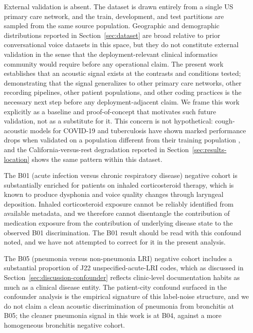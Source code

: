 \documentclass[utf8]{FrontiersinHarvard} %
\begin{document}
External validation is absent. The dataset is drawn entirely from a single US primary care network, and the train, development, and test partitions are sampled from the same source population. Geographic and demographic distributions reported in Section~\ref{sec:dataset} are broad relative to prior conversational voice datasets in this space, but they do not constitute external validation in the sense that the deployment-relevant clinical informatics community would require before any operational claim. The present work establishes that an acoustic signal exists at the contrasts and conditions tested; demonstrating that the signal generalizes to other primary care networks, other recording pipelines, other patient populations, and other coding practices is the necessary next step before any deployment-adjacent claim. We frame this work explicitly as a baseline and proof-of-concept that motivates such future validation, not as a substitute for it. This concern is not hypothetical: cough-acoustic models for COVID-19 and tuberculosis have shown marked performance drops when validated on a population different from their training population \citep{zimmer-covid-cross-site-2026,zimmer-tb-external-validation-2026}, and the California-versus-rest degradation reported in Section~\ref{sec:results-location} shows the same pattern within this dataset.

The B01 (acute infection versus chronic respiratory disease) negative cohort is substantially enriched for patients on inhaled corticosteroid therapy, which is known to produce dysphonia and voice quality changes through laryngeal deposition. Inhaled corticosteroid exposure cannot be reliably identified from available metadata, and we therefore cannot disentangle the contribution of medication exposure from the contribution of underlying disease state to the observed B01 discrimination. The B01 result should be read with this confound noted, and we have not attempted to correct for it in the present analysis.

The B05 (pneumonia versus non-pneumonia LRI) negative cohort includes a substantial proportion of J22 unspecified-acute-LRI codes, which as discussed in Section~\ref{sec:discussion-confounder} reflects clinic-level documentation habits as much as a clinical disease entity. The patient-city confound surfaced in the confounder analysis is the empirical signature of this label-noise structure, and we do not claim a clean acoustic discrimination of pneumonia from bronchitis at B05; the cleaner pneumonia signal in this work is at B04, against a more homogeneous bronchitis negative cohort.
\end{document}
